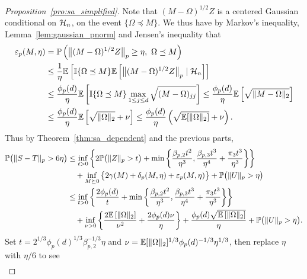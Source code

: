 \begin{proof}[Proposition~\ref{pro:sa_simplified}]
  Note that $(M -\Omega)^{1/2}Z$ is a centered Gaussian
  conditional on $\mathcal{H}_n$,
  on the event $\{\Omega \preceq M\}$.
  We thus have by Markov's inequality,
  Lemma~\ref{lem:gaussian_pnorm}
  and Jensen's inequality that
  \begin{align*}
    \varepsilon_p(M, \eta)
    &= \mathbb{P}\left(\big\| (M - \Omega)^{1/2} Z \big\|_p\geq \eta, \
    \Omega \preceq M\right) \\
    &\leq
    \frac{1}{\eta}
    \mathbb{E}\left[
      \mathbb{I}\{\Omega \preceq M\}
      \mathbb{E}\left[
        \big\| (M - \Omega)^{1/2} Z \big\|_p
        \mid \mathcal{H}_n
      \right]
    \right] \\
    &\leq
    \frac{\phi_p(d)}{\eta}
    \mathbb{E}\left[
      \mathbb{I}\{\Omega \preceq M\}
      \max_{1 \leq j \leq d}
      \sqrt{(M - \Omega)_{j j}}
    \right]
    \leq
    \frac{\phi_p(d)}{\eta}
    \mathbb{E}\left[
      \sqrt{\|M - \Omega\|_2}
    \right] \\
    &\leq
    \frac{\phi_p(d)}{\eta}
    \mathbb{E}\left[
      \sqrt{\|\Omega\|_2} + \nu
    \right]
    \leq
    \frac{\phi_p(d)}{\eta}
    \left(\sqrt{\mathbb{E}[\|\Omega\|_2]} + \nu \right).
  \end{align*}
  Thus by Theorem~\ref{thm:sa_dependent} and the previous parts,
  \begin{align*}
    \mathbb{P}\big(\|S-T\|_p > 6\eta\big)
    &\leq
    \inf_{t>0}
    \left\{
      2 \mathbb{P}\big(\|Z\|_p>t\big)
      + \min\left\{
        \frac{\beta_{p,2} t^2}{\eta^3},
        \frac{\beta_{p,3} t^3}{\eta^4}
        + \frac{\pi_3 t^3}{\eta^3}
      \right\}
    \right\} \\
    &\quad+
    \inf_{M \succeq 0}
    \big\{ 2\gamma(M) + \delta_p(M,\eta)
    + \varepsilon_p(M, \eta)\big\}
    +\mathbb{P}\big(\|U\|_p>\eta\big) \\
    &\leq
    \inf_{t>0}
    \left\{
      \frac{2 \phi_p(d)}{t}
      + \min\left\{
        \frac{\beta_{p,2} t^2}{\eta^3},
        \frac{\beta_{p,3} t^3}{\eta^4}
        + \frac{\pi_3 t^3}{\eta^3}
      \right\}
    \right\} \\
    &\quad+
    \inf_{\nu > 0}
    \left\{ \frac{2\mathbb{E} \left[ \|\Omega\|_2 \right]}{\nu^2}
      + \frac{2 \phi_p(d) \nu}{\eta}
    \right\}
    + \frac{\phi_p(d) \sqrt{\mathbb{E} \left[ \|\Omega\|_2 \right]}}{\eta}
    +\mathbb{P}\big(\|U\|_p>\eta\big).
  \end{align*}
  Set $t = 2^{1/3} \phi_p(d)^{1/3} \beta_{p,2}^{-1/3} \eta$
  and $\nu = \mathbb{E}[\|\Omega\|_2]^{1/3} \phi_p(d)^{-1/3} \eta^{1/3}$,
  then replace $\eta$ with $\eta / 6$ to see
  \begin{align*}

\end{align*}
\end{proof}
